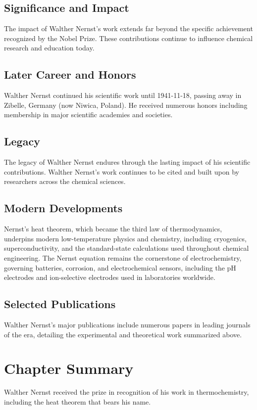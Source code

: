 \subsection*{Significance and Impact}

The impact of Walther Nernst's work extends far beyond the specific achievement recognized by the Nobel Prize.
These contributions continue to influence chemical research and education today.

\subsection*{Later Career and Honors}

Walther Nernst continued his scientific work until 1941-11-18, passing away in Zibelle, Germany (now Niwica, Poland).
He received numerous honors including membership in major scientific academies and societies.

\subsection*{Legacy}

The legacy of Walther Nernst endures through the lasting impact of his scientific contributions.
Walther Nernst's work continues to be cited and built upon by researchers across the chemical sciences.

\subsection*{Modern Developments}

Nernst's heat theorem, which became the third law of thermodynamics, underpins modern low-temperature physics and chemistry, including cryogenics, superconductivity, and the standard-state calculations used throughout chemical engineering. The Nernst equation remains the cornerstone of electrochemistry, governing batteries, corrosion, and electrochemical sensors, including the pH electrodes and ion-selective electrodes used in laboratories worldwide.

\subsection*{Selected Publications}

Walther Nernst's major publications include numerous papers in leading journals of the era, detailing the experimental and theoretical work summarized above.

\clearpage

\section*{Chapter Summary}

Walther Nernst received the prize in recognition of his work in thermochemistry, including the heat theorem that bears his name.

